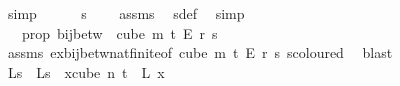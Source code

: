 \begin{isabellebody}
\ simp\isanewline
\ \ \ \ \isamarkupfalse%
\ {\isachardoublequoteopen}s\ {\isachargreater}{\kern0pt}\ {}{\isachardoublequoteclose}\ \isamarkupfalse%
\ assms{\isacharparenleft}{\kern0pt}{}{\isacharparenright}{\kern0pt}\ \isamarkupfalse%
\ s{\isacharunderscore}{\kern0pt}def\ \isamarkupfalse%
\ simp\isanewline
\ \ \ \ \isamarkupfalse%
\ \isamarkupfalse%
\ {\isasymphi}\ \ {\isasymphi}{\isacharunderscore}{\kern0pt}prop{\isacharcolon}{\kern0pt}\ {\isachardoublequoteopen}bij{\isacharunderscore}{\kern0pt}betw\ {\isasymphi}\ {\isacharparenleft}{\kern0pt}cube\ m\ {\isacharparenleft}{\kern0pt}t{\isacharplus}{\kern0pt}{}{\isacharparenright}{\kern0pt}\ {\isasymrightarrow}\isactrlsub E\ {\isacharbraceleft}{\kern0pt}{\isachardot}{\kern0pt}{\isachardot}{\kern0pt}{\isacharless}{\kern0pt}r{\isacharbraceright}{\kern0pt}{\isacharparenright}{\kern0pt}\ {\isacharbraceleft}{\kern0pt}{\isachardot}{\kern0pt}{\isachardot}{\kern0pt}{\isacharless}{\kern0pt}s{\isacharbraceright}{\kern0pt}{\isachardoublequoteclose}\ \isanewline
\ \ \ \ \ \ \isamarkupfalse%
\ assms{\isacharparenleft}{\kern0pt}{}{\isacharparenright}{\kern0pt}\ ex{\isacharunderscore}{\kern0pt}bij{\isacharunderscore}{\kern0pt}betw{\isacharunderscore}{\kern0pt}nat{\isacharunderscore}{\kern0pt}finite{\isacharunderscore}{\kern0pt}{}{\isacharbrackleft}{\kern0pt}of\ {\isachardoublequoteopen}cube\ m\ {\isacharparenleft}{\kern0pt}t{\isacharplus}{\kern0pt}{}{\isacharparenright}{\kern0pt}\ {\isasymrightarrow}\isactrlsub E\ {\isacharbraceleft}{\kern0pt}{\isachardot}{\kern0pt}{\isachardot}{\kern0pt}{\isacharless}{\kern0pt}r{\isacharbraceright}{\kern0pt}{\isachardoublequoteclose}\ {\isachardoublequoteopen}s{\isachardoublequoteclose}{\isacharbrackright}{\kern0pt}\ s{\isacharunderscore}{\kern0pt}coloured\ \isamarkupfalse%
\ blast\isanewline
\ \ \ \ \isamarkupfalse%
\ {\isasymchi}L{\isacharunderscore}{\kern0pt}s\ \ {\isachardoublequoteopen}{\isasymchi}L{\isacharunderscore}{\kern0pt}s\ {\isasymequiv}\ {\isacharparenleft}{\kern0pt}{\isasymlambda}x{\isasymin}cube\ n\ {\isacharparenleft}{\kern0pt}t{\isacharplus}{\kern0pt}{}{\isacharparenright}{\kern0pt}{\isachardot}{\kern0pt}\ {\isasymphi}\ {\isacharparenleft}{\kern0pt}{\isasymchi}L\ x{\isacharparenright}{\kern0pt}{\isacharparenright}{\kern0pt}{\isachardoublequoteclose}\isanewline
\ \ \ \ \isamarkupfalse%

\end{isabellebody}
